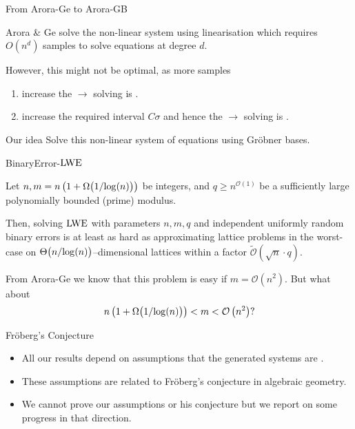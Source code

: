 \documentclass[10pt]{beamer}
\newcommand{\bigO}[1]{\ensuremath{\mathcal{O}\left({#1}\right)}\xspace}
\newcommand{\tildeO}[1]{\ensuremath{\tilde{\mathcal{O}}(#1)}\xspace}
\newcommand{\nbvar}{n}
\newcommand{\nbeq}{m}
\newcommand\LWE{\ensuremath{{\rm LWE}}\xspace}
\newcommand{\cemph}[1]{{\color{yellow9}{\bf #1}}\xspace}
\begin{document}
\begin{frame}{From Arora-Ge to Arora-GB}

Arora \& Ge solve the non-linear system using linearisation which requires $O(n^d)$ samples to solve equations at degree $d$.

\vspace{1em}

However, this might not be optimal, as more samples
\begin{enumerate}
  \item increase the \cemph{number of equations} $\rightarrow$ solving is \cemph{easier}.
  \item increase the required interval $C\sigma$ and hence the \cemph{degree} $\rightarrow$ solving is \cemph{harder}.
\end{enumerate}

\vspace{1em}

\begin{block}{Our idea}
Solve this non-linear system of equations using Gröbner bases.
\end{block}

\end{frame}

\begin{frame}{BinaryError-\LWE}
 
\begin{theorem}[BinaryError-\LWE]
Let $\nbvar,\nbeq=\nbvar\left(1+\Omega\big(1/{\rm log}( \nbvar)\big)\right)$ be integers, and $q\geq \nbvar^{\bigO{1}}$ be a sufficiently large polynomially bounded (prime) modulus.

\vspace{1em}

Then, solving \LWE with parameters $\nbvar, \nbeq,q$ and independent uniformly random binary errors is at least as hard as approximating lattice problems in the worst-case on $\Theta\big(\nbvar/{\rm log}(\nbvar)\big)$--dimensional lattices within a factor $\tildeO{\sqrt{\nbvar}\cdot q}$. 
\end{theorem}

\begin{block}{}
From Arora-Ge we know that this problem is easy if $m = \bigO{n^2}$. But what about $$\nbvar\left(1+\Omega\big(1/{\rm log}( \nbvar)\big)\right) < m < \bigO{n^2}?$$
\end{block}
\end{frame}

\begin{frame}{Fröberg's Conjecture}

\begin{itemize}
  \item All our results depend on assumptions that the generated systems are \cemph{semi-regular}.
  \item These assumptions are related to Fröberg's conjecture in algebraic geometry.
  \item We cannot prove our assumptions or his conjecture but we report on some progress in that direction.
\end{itemize}

  
\end{frame}
\end{document}
